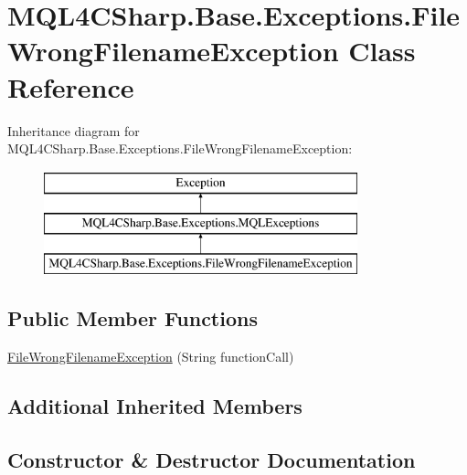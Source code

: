 \hypertarget{class_m_q_l4_c_sharp_1_1_base_1_1_exceptions_1_1_file_wrong_filename_exception}{}\section{M\+Q\+L4\+C\+Sharp.\+Base.\+Exceptions.\+File\+Wrong\+Filename\+Exception Class Reference}
\label{class_m_q_l4_c_sharp_1_1_base_1_1_exceptions_1_1_file_wrong_filename_exception}
Inheritance diagram for M\+Q\+L4\+C\+Sharp.\+Base.\+Exceptions.\+File\+Wrong\+Filename\+Exception\+:\begin{figure}[H]
\begin{center}
\leavevmode
\includegraphics[height=3.000000cm]{class_m_q_l4_c_sharp_1_1_base_1_1_exceptions_1_1_file_wrong_filename_exception}
\end{center}
\end{figure}
\subsection*{Public Member Functions}
\begin{DoxyCompactItemize}
\item 
\hyperlink{class_m_q_l4_c_sharp_1_1_base_1_1_exceptions_1_1_file_wrong_filename_exception_a069719a19afca29e07297d7b472f4e20}{File\+Wrong\+Filename\+Exception} (String function\+Call)
\end{DoxyCompactItemize}
\subsection*{Additional Inherited Members}


\subsection{Constructor \& Destructor Documentation}
